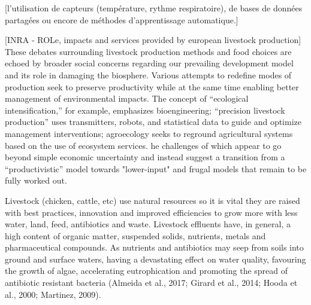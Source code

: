 [l’utilisation de capteurs (température, rythme respiratoire), de bases de données partagées ou encore de méthodes d’apprentissage automatique.]



[INRA - ROLe, impacts and services provided by european livestock production]
These debates surrounding livestock production methods and food
choices are echoed by broader social concerns regarding our prevailing
development model and its role in damaging the biosphere. Various
attempts to redefine modes of production seek to preserve
productivity while at the same time enabling better management of
environmental impacts. The concept of “ecological intensification,” for
example, emphasizes bioengineering; “precision livestock production”
uses transmitters, robots, and statistical data to guide and optimize
management interventions; agroecology seeks to reground agricultural
systems based on the use of ecosystem services. he challenges of which appear to
go beyond simple economic uncertainty and instead suggest a transition
from a “productivistic” model towards "lower-input" and frugal models that
remain to be fully worked out.

Livestock (chicken, cattle, etc) use natural resources so it is vital they are raised with best practices, innovation and improved efficiencies to grow more with less water, land, feed, antibiotics and waste. Livestock effluents have, in general, a high content of organic matter, suspended solids, nutrients, metals and pharmaceutical compounds. As nutrients and antibiotics may seep from soils into ground and surface waters, having a devastating effect on water quality, favouring the growth of algae, accelerating eutrophication and promoting the spread of antibiotic resistant bacteria (Almeida et al., 2017; Girard et al., 2014; Hooda et al., 2000; Martinez, 2009).



